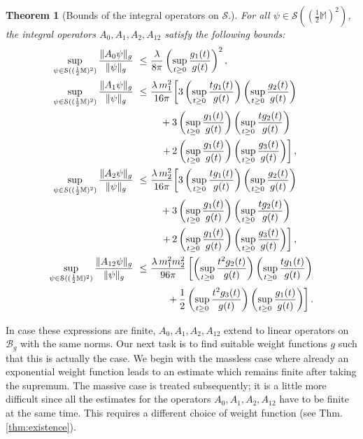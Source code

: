 \documentclass[b5paper,draft,openbib,12pt]{memoir}
\newtheorem{Thm}[Def]{Theorem}
\newcommand{\M}{\mathbb{M}}
\newcommand{\Banach}{\mathscr{B}}
\begin{document}
\begin{Thm}[Bounds of the integral operators on $\mathcal{S}$.]
	\label{thm:boundsKG}
	For all $\psi \in \mathcal{S}((\tfrac{1}{2}\M)^2)$, the integral operators $A_0, A_1, A_2, A_{12}$ satisfy the following bounds:
	\begin{align}
		\sup_{\psi \in \mathcal{S}((\frac{1}{2}\M)^2)} \frac{\| A_0 \psi \|_g}{\| \psi \|_g} ~\leq~& \frac{\lambda}{8\pi} \left(\sup_{t\geq 0} \frac{g_1(t)}{g(t)}\right)^2\label{eq:estimatea0},\\
%
  \sup_{\psi \in \mathcal{S}((\frac{1}{2}\M)^2)} \frac{\| A_1 \psi \|_g}{\| \psi \|_g} ~\leq~& \frac{\lambda \, m_1^2}{16\pi} \bigg[ 3\left(\sup_{t\geq 0}\frac{t g_1(t)}{g(t)}\right)\left(\sup_{t\geq 0}\frac{g_2(t)}{g(t)}\right) \notag\\
  &\quad+ 3\left( \sup_{t\geq 0} \frac{g_1(t)}{g(t)} \right)\left( \sup_{t\geq 0} \frac{tg_2(t)}{g(t)} \right) \nonumber\\
	&\quad\left. +\, 2 \left( \sup_{t\geq 0} \frac{g_1(t)}{g(t)} \right)\left( \sup_{t\geq 0} \frac{g_3(t)}{g(t)} \right) \right], \label{eq:estimatea1}\\
%
  \sup_{\psi \in \mathcal{S}((\frac{1}{2}\M)^2)} \frac{\| A_2 \psi \|_g}{\| \psi \|_g} ~\leq~& \frac{\lambda \, m_2^2}{16\pi} \bigg[ 3\left(\sup_{t\geq 0}\frac{t g_1(t)}{g(t)}\right)\left(\sup_{t\geq 0}\frac{g_2(t)}{g(t)}\right) \notag\\
  &\quad+ 3\left( \sup_{t\geq 0} \frac{g_1(t)}{g(t)} \right)\left( \sup_{t\geq 0} \frac{tg_2(t)}{g(t)} \right) \nonumber\\
	&\quad\left. + \, 2 \left( \sup_{t\geq 0} \frac{g_1(t)}{g(t)} \right)\left( \sup_{t\geq 0} \frac{g_3(t)}{g(t)} \right) \right], \label{eq:estimatea2}\\
	\sup_{\psi \in \mathcal{S}((\frac{1}{2}\M)^2)} \frac{\| A_{12} \psi \|_g}{\| \psi \|_g} ~\leq~& \frac{\lambda \, m_1^2 m_2^2}{96\pi} \left[ \left( \sup_{t\geq 0} \frac{t^2 g_2(t)}{g(t)}\right)\left( \sup_{t\geq 0} \frac{t g_1(t)}{g(t)}\right) \right.\nonumber\\
&~~~~~\left.+ \, \frac{1}{2}  \left( \sup_{t\geq 0} \frac{t^2 g_3(t)}{g(t)}\right)\left( \sup_{t\geq 0} \frac{g_1(t)}{g(t)}\right) \right].\label{eq:estimatea12}
	\end{align}
\end{Thm}
In case these expressions are finite, $A_0, A_1, A_2, A_{12}$ 
extend to linear operators on $\Banach_g$ with the same norms. Our 
next task is to find suitable weight functions $g$ such that this 
is actually the case. We begin with the massless case where already 
an exponential weight function leads to an estimate which remains 
finite after taking the supremum. The massive case is treated 
subsequently; it is a little more difficult since all the estimates 
for the operators $A_0, A_1, A_2, A_{12}$ have to be finite at 
the same time. This  requires a different choice of weight 
function (see Thm.\@ \ref{thm:existence}).
\end{document}
